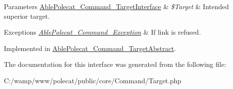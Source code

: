 \begin{DoxyParams}[1]{Parameters}
\hyperlink{interface_able_polecat___command___target_interface}{Able\+Polecat\+\_\+\+Command\+\_\+\+Target\+Interface} & {\em \$\+Target} & Intended superior target.\\
\hline
\end{DoxyParams}

\begin{DoxyExceptions}{Exceptions}
{\em \hyperlink{class_able_polecat___command___exception}{Able\+Polecat\+\_\+\+Command\+\_\+\+Exception}} & If link is refused. \\
\hline
\end{DoxyExceptions}


Implemented in \hyperlink{class_able_polecat___command___target_abstract_af3c33319c9af5cebf6598ce57dfcaf49}{Able\+Polecat\+\_\+\+Command\+\_\+\+Target\+Abstract}.



The documentation for this interface was generated from the following file\+:\begin{DoxyCompactItemize}
\item 
C\+:/wamp/www/polecat/public/core/\+Command/Target.\+php\end{DoxyCompactItemize}

